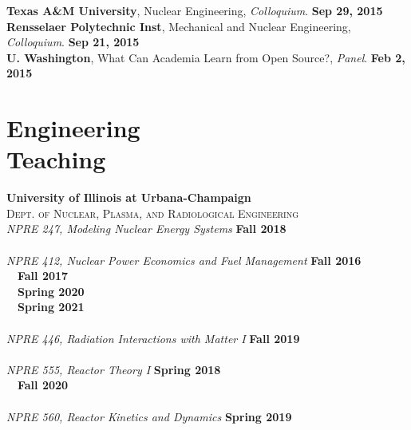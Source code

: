 \documentclass[margin,line]{resume}
\begin{document}
\begin{resume}
      \textbf{Texas A\&M University}, Nuclear Engineering, \emph{Colloquium}.                      \hfill\textbf{ Sep 29, 2015}\\
      \textbf{Rensselaer Polytechnic Inst}, Mechanical and Nuclear Engineering, \emph{Colloquium}. \hfill\textbf{Sep 21, 2015}\\
      \textbf{U. Washington}, What Can Academia Learn from Open Source?, \emph{Panel}.   \hfill\textbf{Feb 2, 2015}

    \section{\mysidestyle Engineering\\Teaching}
    \textbf{University of Illinois at Urbana-Champaign}\\
    \textsc{Dept. of Nuclear, Plasma, and Radiological Engineering}\\
               \textsl{NPRE 247, Modeling Nuclear Energy Systems} \hfill \textbf{Fall 2018}\\
               \vspace{2mm}\\
               \textsl{NPRE 412, Nuclear Power Economics and Fuel Management} \hfill \textbf{Fall 2016}\\
               \mbox{ }~\hfill \textbf{Fall 2017}\\
               \mbox{ }~\hfill \textbf{Spring 2020}\\
               \mbox{ }~\hfill \textbf{Spring 2021}\\
               \vspace{2mm}\\
               \textsl{NPRE 446, Radiation Interactions with Matter I} \hfill \textbf{Fall 2019}\\
               \vspace{2mm}\\
               \textsl{NPRE 555, Reactor Theory I} \hfill \textbf{Spring 2018}\\
               \mbox{ }~\hfill \textbf{Fall 2020}\\
               \vspace{2mm}\\
               \textsl{NPRE 560, Reactor Kinetics and Dynamics} \hfill \textbf{Spring 2019}\\

\end{resume}
\end{document}
